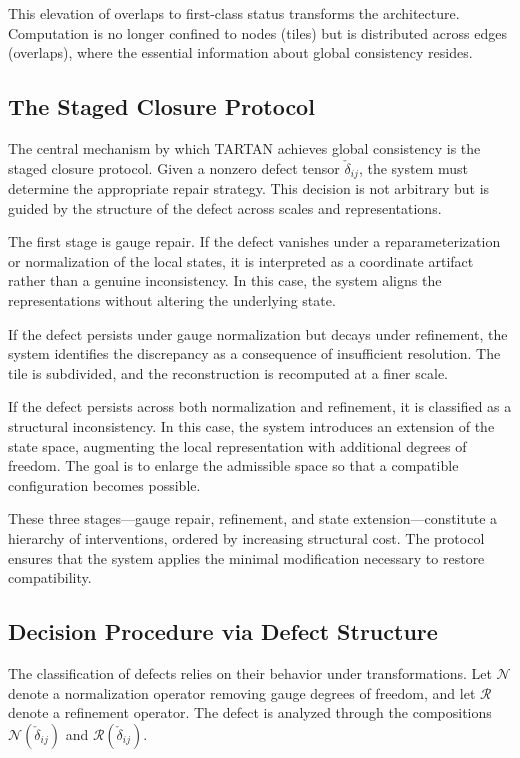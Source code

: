 \documentclass[12pt, oneside]{article}
\begin{document}
This elevation of overlaps to first-class status transforms the architecture. Computation is no longer confined to nodes (tiles) but is distributed across edges (overlaps), where the essential information about global consistency resides.

\subsection{The Staged Closure Protocol}

The central mechanism by which TARTAN achieves global consistency is the staged closure protocol. Given a nonzero defect tensor $\check{\delta}_{ij}$, the system must determine the appropriate repair strategy. This decision is not arbitrary but is guided by the structure of the defect across scales and representations.

The first stage is gauge repair. If the defect vanishes under a reparameterization or normalization of the local states, it is interpreted as a coordinate artifact rather than a genuine inconsistency. In this case, the system aligns the representations without altering the underlying state.

If the defect persists under gauge normalization but decays under refinement, the system identifies the discrepancy as a consequence of insufficient resolution. The tile is subdivided, and the reconstruction is recomputed at a finer scale.

If the defect persists across both normalization and refinement, it is classified as a structural inconsistency. In this case, the system introduces an extension of the state space, augmenting the local representation with additional degrees of freedom. The goal is to enlarge the admissible space so that a compatible configuration becomes possible.

These three stages---gauge repair, refinement, and state extension---constitute a hierarchy of interventions, ordered by increasing structural cost. The protocol ensures that the system applies the minimal modification necessary to restore compatibility.

\subsection{Decision Procedure via Defect Structure}

The classification of defects relies on their behavior under transformations. Let $\mathcal{N}$ denote a normalization operator removing gauge degrees of freedom, and let $\mathcal{R}$ denote a refinement operator. The defect is analyzed through the compositions $\mathcal{N}(\check{\delta}_{ij})$ and $\mathcal{R}(\check{\delta}_{ij})$.
\end{document}
